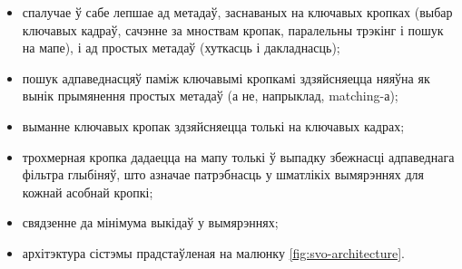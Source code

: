 \begin{itemize}
  \item спалучае ў сабе лепшае ад метадаў, заснаваных на ключавых кропках (выбар
  ключавых кадраў, сачэнне за мноствам кропак, паралельны трэкінг і пошук на мапе),
  і ад простых метадаў (хуткасць і дакладнасць);
  \item пошук адпаведнасцяў паміж ключавымі кропкамі здзяйсняецца няяўна як вынік
  прымянення простых метадаў (а не, напрыклад, matching-а);
  \item выманне ключавых кропак здзяйсняецца толькі на ключавых кадрах;
  \item трохмерная кропка дадаецца на мапу толькі ў выпадку збежнасці адпаведнага
  фільтра глыбіняў, што азначае патрэбнасць у шматлікіх вымярэннях для кожнай асобнай кропкі;
  \item свядзенне да мінімума выкідаў у вымярэннях;
  \item архітэктура сістэмы прадстаўленая на малюнку \ref{fig:svo-architecture}.
\end{itemize}

\newpage

